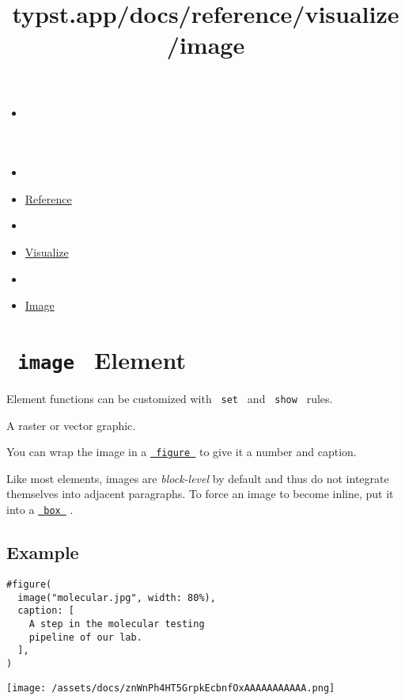 \title{typst.app/docs/reference/visualize/image}

\begin{itemize}
\tightlist
\item
  \href{/docs}{}
\item
  
\item
  \href{/docs/reference/}{Reference}
\item
  
\item
  \href{/docs/reference/visualize/}{Visualize}
\item
  
\item
  \href{/docs/reference/visualize/image/}{Image}
\end{itemize}

\section{\texorpdfstring{\texttt{\ image\ } {{ Element
}}}{ image   Element }}\label{summary}

\label{element-tooltip}
Element functions can be customized with \texttt{\ set\ } and
\texttt{\ show\ } rules.

A raster or vector graphic.

You can wrap the image in a
\href{/docs/reference/model/figure/}{\texttt{\ figure\ }} to give it a
number and caption.

Like most elements, images are \emph{block-level} by default and thus do
not integrate themselves into adjacent paragraphs. To force an image to
become inline, put it into a
\href{/docs/reference/layout/box/}{\texttt{\ box\ }} .

\subsection{Example}\label{example}

\begin{verbatim}
#figure(
  image("molecular.jpg", width: 80%),
  caption: [
    A step in the molecular testing
    pipeline of our lab.
  ],
)
\end{verbatim}

\texttt{[image: /assets/docs/znWnPh4HT5GrpkEcbnfOxAAAAAAAAAAA.png]}

